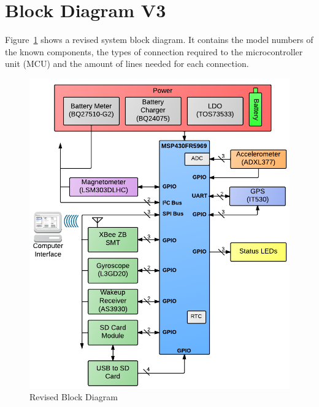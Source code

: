 \section{Block Diagram V3}

Figure~\ref{fig:blockDiagram} shows a revised system block diagram.  It contains the model numbers of the known components, the types of connection required to the microcontroller unit (MCU) and the amount of lines needed for each connection.

\begin{figure}[H]
	\centering
	\includegraphics[width=\textwidth]{img/blockDiagramV3}
	\caption{Revised Block Diagram \label{fig:blockDiagram}}
\end{figure}
